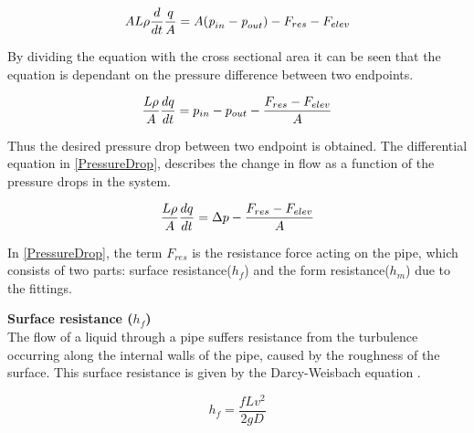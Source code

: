 \begin{equation}
    A L \rho \frac{d}{dt} \frac{q}{A} = A (\textit{p}_{in} -  \textit{p}_{out}) - F_{res} - F_{elev}\\
\end{equation}

By dividing the equation with the cross sectional area it can be seen that the equation is dependant on the pressure difference between two endpoints.

\begin{equation}
    \frac{L \rho}{A} \frac{dq}{dt} =p_{in} - p_{out} - \frac{ F_{res} - F_{elev}}{A} \\
\end{equation}

Thus the desired pressure drop between two endpoint is obtained. The differential equation in \eqref{PressureDrop}, describes the change in flow as a function of the pressure drops in the system.

\begin{equation}
    \frac{L \rho}{A} \frac{dq}{dt} =\Delta p - \frac{ F_{res} - F_{elev}}{A} \\
    \label{PressureDrop}
\end{equation}

In \eqref{PressureDrop}, the term $F_{res}$ is the resistance force acting on the 
pipe, which consists of two parts: surface resistance($h_{f}$) and the form resistance($h_{m}$) due to the fittings. %

\textbf{Surface resistance (\texorpdfstring{$h_f$}{})} \\
The flow of a liquid through a pipe suffers resistance from 
the turbulence occurring along the internal walls of the pipe, caused by the roughness of the surface. This surface resistance is given by the Darcy-Weisbach equation \cite{Design_Water}.

\begin{equation}
  h_f = \frac{fLv^2}{2gD}
  \label{Darcy}
\end{equation}

